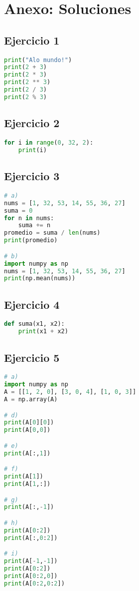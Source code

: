\documentclass[12pt]{article}
\begin{document}
\newpage

\section{Anexo: Soluciones}

\subsection{Ejercicio 1}
\begin{lstlisting}[language=Python]
print("Alo mundo!")
print(2 + 3)
print(2 * 3)
print(2 ** 3)
print(2 / 3)
print(2 % 3)
\end{lstlisting}

\subsection{Ejercicio 2}
\begin{lstlisting}[language=Python]
for i in range(0, 32, 2):
    print(i)
\end{lstlisting}

\subsection{Ejercicio 3}
\begin{lstlisting}[language=Python]
# a)
nums = [1, 32, 53, 14, 55, 36, 27]
suma = 0
for n in nums:
    suma += n
promedio = suma / len(nums)
print(promedio)

# b)
import numpy as np
nums = [1, 32, 53, 14, 55, 36, 27]
print(np.mean(nums))
\end{lstlisting}

\subsection{Ejercicio 4}
\begin{lstlisting}[language=Python]
def suma(x1, x2):
    print(x1 + x2)
\end{lstlisting}

\subsection{Ejercicio 5}
\begin{lstlisting}[language=Python]
# a)
import numpy as np
A = [[1, 2, 0], [3, 0, 4], [1, 0, 3]]
A = np.array(A)

# d)
print(A[0][0])
print(A[0,0])

# e)
print(A[:,1])

# f)
print(A[1])
print(A[1,:])

# g)
print(A[:,-1])

# h)
print(A[0:2])
print(A[:,0:2])

# i)
print(A[-1,-1])
print(A[0:2])
print(A[0:2,0])
print(A[0:2,0:2])
\end{lstlisting}
\end{document}
